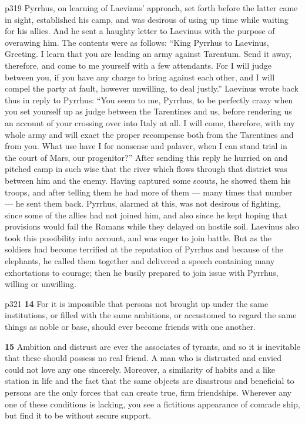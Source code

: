 p319
Pyrrhus, on learning of Laevinus' approach, set forth before the latter came in sight, established his camp, and was desirous of using up time while waiting for his allies. And he sent a haughty letter to Laevinus with the purpose of overawing him. The contents were as follows: ``King Pyrrhus to Laevinus, Greeting. I learn that you are leading an army against Tarentum. Send it away, therefore, and come to me yourself with a few attendants. For I will judge between you, if you have any charge to bring against each other, and I will compel the party at fault, however unwilling, to deal justly.'' Laevinus wrote back thus in reply to Pyrrhus: ``You seem to me, Pyrrhus, to be perfectly crazy when you set yourself up as judge between the Tarentines and us, before rendering us an account of your crossing over into Italy at all. I will come, therefore, with my whole army and will exact the proper recompense both from the Tarentines and from you. What use have I for nonsense and palaver, when I can stand trial in the court of Mars, our progenitor?'' After sending this reply he hurried on and pitched camp in such wise that the river which flows through that district was between him and the enemy. Having captured some scouts, he showed them his troops, and after telling them he had more of them \texthebrew{—} many times that number \texthebrew{—} he sent them back. Pyrrhus, alarmed at this, was not desirous of fighting, since some of the allies had not joined him, and also since he kept hoping that provisions would fail the Romans while they delayed on hostile soil. Laevinus also took this possibility into account, and was eager to join battle. But as the soldiers had become terrified at the reputation of Pyrrhus and because of the elephants, he called them together and delivered a speech containing many exhortations to courage; then he busily prepared to join issue with Pyrrhus, willing or unwilling.

p321
\textbf{14} For it is impossible that persons not brought up under the same institutions, or filled with the same ambitions, or accustomed to regard the same things as noble or base, should ever become friends with one another.

\textbf{15} Ambition and distrust are ever the associates of tyrants, and so it is inevitable that these should possess no real friend. A man who is distrusted and envied could not love any one sincerely. Moreover, a similarity of habits and a like station in life and the fact that the same objects are disastrous and beneficial to persons are the only forces that can create true, firm friendships. Wherever any one of these conditions is lacking, you see a fictitious appearance of comrade ­ship, but find it to be without secure support.


